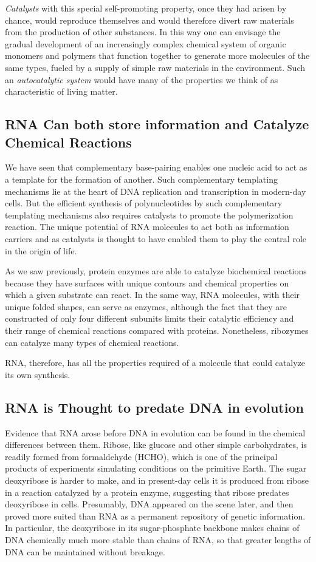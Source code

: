 \textit{Catalysts} with this special self-promoting property, once they had arisen
by chance, would reproduce themselves and would therefore divert raw
materials from the production of other substances. In this way one can
envisage the gradual development of an increasingly complex chemical
system of organic monomers and polymers that function together to generate
more molecules of the same types, fueled by a supply of simple
raw materials in the environment. Such an \textit{autocatalytic system} would
have many of the properties we think of as characteristic of living matter.

\subsection{RNA Can both store information and Catalyze Chemical Reactions}

We have seen that complementary base-pairing enables one nucleic acid
to act as a template for the formation of another. Such
complementary templating mechanisms lie at the heart of DNA replication
and transcription in modern-day cells.
But the efficient synthesis of polynucleotides by such complementary
templating mechanisms also requires catalysts to promote the polymerization
reaction. The unique potential of RNA molecules to
act both as information carriers and as catalysts is thought to have enabled
them to play the central role in the origin of life.

As we saw previously, protein enzymes are able to catalyze biochemical
reactions because they have surfaces with unique contours and chemical
properties on which a given substrate can react. In the same way,
RNA molecules, with their unique folded shapes, can serve as enzymes,
although the fact that they are constructed of only four different
subunits limits their catalytic efficiency and their range of chemical
reactions compared with proteins. Nonetheless, ribozymes can catalyze
many types of chemical reactions.

RNA, therefore, has all the properties required of a molecule that could
catalyze its own synthesis.

\subsection{RNA is Thought to predate DNA in evolution}

Evidence that RNA arose before DNA in evolution can be found in the
chemical differences between them. Ribose, like glucose and other
simple carbohydrates, is readily formed from formaldehyde
(HCHO), which is one of the principal products of experiments simulating
conditions on the primitive Earth. The sugar deoxyribose is harder to
make, and in present-day cells it is produced from ribose in a reaction
catalyzed by a protein enzyme, suggesting that ribose predates deoxyribose
in cells. Presumably, DNA appeared on the scene later, and then
proved more suited than RNA as a permanent repository of genetic information.
In particular, the deoxyribose in its sugar-phosphate backbone
makes chains of DNA chemically much more stable than chains of RNA,
so that greater lengths of DNA can be maintained without breakage.

